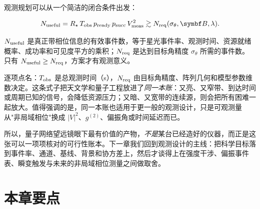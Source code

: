 观测规划可以从一个简洁的闭合条件出发：

\begin{equation}
  N_{\rm useful}
  =
  R_\star\,T_{\rm obs}\,
  p_{\rm ready}\,p_{\rm succ}\,V_{\rm meas}^2
  \gtrsim
  N_{\rm req}(\sigma_\theta,\bm{B},\lambda) .
  \label{eq:e24-useful-events}
\end{equation}
\begin{formulaexplain}
\(N_{\rm useful}\) 是真正带相位信息的有效事件数，等于星光事件率、观测时间、资源就绪概率、成功率和可见度平方的乘积；\(N_{\rm req}\) 是达到目标角精度 \(\sigma_\theta\) 所需的事件数。只有 \(N_{\rm useful}\ge N_{\rm req}\)，方案才有观测意义。
\end{formulaexplain}

逐项点名：\(T_{\rm obs}\) 是总观测时间（s），\(N_{\rm req}\) 由目标角精度、阵列几何和模型参数维数决定。这条式子把天文学和量子工程放进了\emph{同一本账}：又亮、又窄带、到达时间或周期已知的信号，会降低资源压力；又暗、又宽带的连续源，则会把所有困难一起放大。值得强调的是，同一本账也适用于更一般的观测设计，只是可观测量从"非局域相位"换成 \(|V|^2\)、\(g^{(2)}\)、偏振角或时间延迟而已。

所以，量子网络望远镜眼下最有价值的产物，\emph{不是}某台已经造好的仪器，而正是这张可以一项项核对的可行性账本。下一章我们回到观测设计的主线：把科学目标落到事件率、通道、基线、背景和协方差上，然后才谈得上在强度干涉、偏振事件表、瞬变触发与未来的非局域相位测量之间做取舍。

\section*{本章要点}

